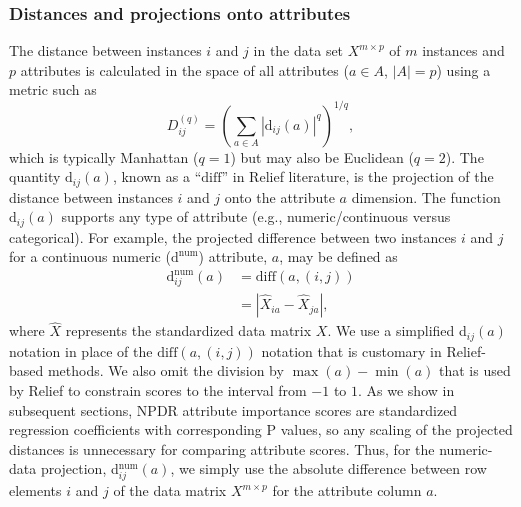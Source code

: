 \documentclass{bioinfo}
\begin{document}
\subsubsection{Distances and projections onto attributes}
The distance between instances $i$ and $j$ in the data set $X^{m \times p}$ of $m$ instances and $p$ attributes is calculated in the space of all attributes ($a \in A$, $|A|=p$) using a metric such as
\begin{equation}\label{eq:D}
D^{(q)}_{ij}=\left(\sum_{a\in A}|\text{d}_{ij}(a)|^q\right)^{1/q},
\end{equation}
which is typically Manhattan ($q=1$) but may also be Euclidean ($q=2$).
The quantity 
$\text{d}_{ij}(a)$,
known as a ``$\text{diff}$'' in Relief literature, is the projection of the distance between instances $i$ and $j$ onto the attribute $a$ dimension.
The function $\text{d}_{ij}(a)$ supports any type of attribute (e.g., numeric/continuous versus categorical).
For example, the projected difference between two instances $i$ and $j$ for a continuous numeric ($\text{d}^{\text{num}}$) attribute, $a$, may be defined as
\begin{equation}\label{eq:diff}
\begin{aligned}
\text{d}^{\text{num}}_{ij}(a)&=\text{diff}(a,(i,j))\\
                                            & = {|\hat{X}_{ia}-\hat{X}_{ja}|},
\end{aligned}
\end{equation}
where $\hat{X}$ represents the standardized data matrix $X$.
We use a simplified d$_{ij}(a)$ notation in place of the $\text{diff}(a,(i,j))$ notation that is customary in Relief-based methods.
We also omit the division by $\max(a)-\min(a)$ that is used by Relief to constrain scores to the interval from $-1$ to $1$.
As we show in subsequent sections, NPDR attribute importance scores are standardized regression coefficients with corresponding P values, so any scaling of the projected distances is unnecessary for comparing attribute scores.
Thus, for the numeric-data projection, d$^{\text{num}}_{ij}(a)$, we simply use the absolute difference between row elements $i$ and $j$ of the data matrix $X^{m \times p}$ for the attribute column $a$.
\end{document}
